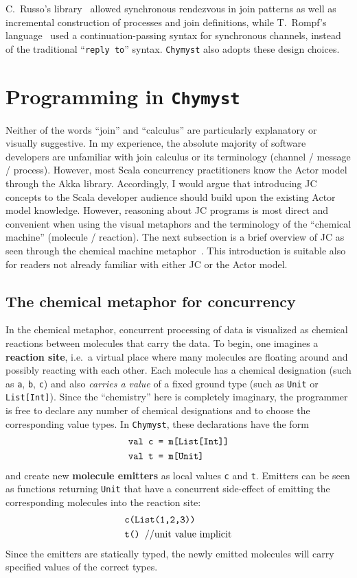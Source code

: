 \documentclass[sigplan,10pt,review,anonymous]{acmart}\settopmatter{printfolios=true}
\begin{document}
C.~Russo's library~\citep{Rus2007} allowed synchronous rendezvous
in join patterns as well as incremental construction of processes
and join definitions, while T.~Rompf's language~\citep{Rom2007}
used a continuation-passing syntax for synchronous channels, instead
of the traditional ``\texttt{reply to}'' syntax. \texttt{Chymyst}
also adopts these design choices.

\section{Programming in \texttt{Chymyst}}

Neither of the words ``join'' and ``calculus'' are particularly
explanatory or visually suggestive. In my experience, the absolute
majority of software developers are unfamiliar with join calculus
or its terminology (channel / message / process). However, most
Scala concurrency practitioners know the Actor model through
the Akka library. Accordingly, I would argue that introducing JC concepts
to the Scala developer audience should build upon the existing Actor
model knowledge. However, reasoning about JC programs is most direct
and convenient when using the visual metaphors and the terminology
of the ``chemical machine'' (molecule / reaction). The next subsection
is a brief overview of JC as seen through the chemical machine metaphor~\citep{FouGon1996}. This introduction is suitable also
for readers not already familiar with either JC or the Actor model.

\subsection{The chemical metaphor for concurrency}

In the chemical metaphor, concurrent processing of data is visualized as
chemical reactions between molecules that carry the data.
To begin, one imagines a \textbf{reaction site}, i.e.~a virtual place
where many molecules are floating around and possibly reacting with
each other. Each molecule has a chemical designation (such as \texttt{a},
\texttt{b}, \texttt{c}) and also \emph{carries a value} of a fixed
ground type (such as \texttt{Unit} or \texttt{List{[}Int{]}}). Since
the ``chemistry'' here is completely imaginary, the programmer is
free to declare any number of chemical designations and to choose
the corresponding value types. In \texttt{Chymyst}, these declarations
have the form
\begin{align*}
\text{\texttt{val c }} & \text{\texttt{= m[List[Int]]}}\\
\text{\texttt{val t }} & \text{\texttt{= m[Unit]}}
\end{align*}
and create new \textbf{molecule emitters} as local values
\texttt{c} and \texttt{t}. Emitters can be seen as functions returning \texttt{Unit}
that
have a concurrent side-effect of emitting the corresponding molecules into the reaction
site:
\begin{align*}
 & \text{\texttt{c(List(1,2,3))}}\\
 & \text{\texttt{t() }//unit value implicit}
\end{align*}
Since the emitters are statically typed, the newly emitted molecules will carry specified values of the
correct types.
\end{document}
